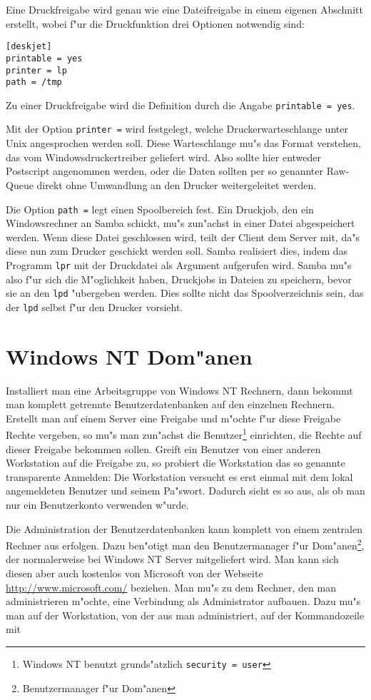 \documentclass{scrartcl}\usepackage{pslatex}\typearea{12}
\newcommand{\prog}{\texttt}
\newcommand{\param}{\texttt}
\begin{document}
Eine Druckfreigabe wird genau wie eine Dateifreigabe in einem eigenen
Abschnitt erstellt, wobei f"ur die Druckfunktion drei Optionen
notwendig sind:

\begin{verbatim}
[deskjet]
printable = yes
printer = lp
path = /tmp
\end{verbatim}

Zu einer Druckfreigabe wird die Definition durch die Angabe
\param{printable = yes}.

Mit der Option \param{printer =} wird festgelegt, welche
Druckerwarteschlange unter Unix angesprochen werden soll. Diese
Warteschlange mu"s das Format verstehen, das vom Windowsdruckertreiber
geliefert wird. Also sollte hier entweder Postscript angenommen
werden, oder die Daten sollten per so genannter Raw-Queue direkt ohne
Umwandlung an den Drucker weitergeleitet werden.

Die Option \param{path =} legt einen Spoolbereich fest. Ein Druckjob,
den ein Windowsrechner an Samba schickt, mu"s zun"achst in einer Datei
abgespeichert werden. Wenn diese Datei geschlossen wird, teilt der
Client dem Server mit, da"s diese nun zum Drucker geschickt werden
soll. Samba realisiert dies, indem das Programm \prog{lpr} mit der
Druckdatei als Argument aufgerufen wird. Samba mu"s also f"ur sich die
M"oglichkeit haben, Druckjobs in Dateien zu speichern, bevor sie an
den \prog{lpd} "ubergeben werden. Dies sollte nicht das
Spoolverzeichnis sein, das der \prog{lpd} selbst f"ur den Drucker
vorsieht.

\section{Windows NT Dom"anen}

Installiert man eine Arbeitsgruppe von Windows NT Rechnern, dann
bekommt man komplett getrennte Benutzerdatenbanken auf den einzelnen
Rechnern. Erstellt man auf einem Server eine Freigabe und m"ochte f"ur
diese Freigabe Rechte vergeben, so mu"s man zun"achst die
Benutzer\footnote{Windows NT benutzt grunds"atzlich \param{security =
    user}} einrichten, die Rechte auf dieser Freigabe bekommen sollen.
Greift ein Benutzer von einer anderen Workstation auf die Freigabe zu,
so probiert die Workstation das so genannte transparente Anmelden: Die
Workstation versucht es erst einmal mit dem lokal angemeldeten
Benutzer und seinem Pa"swort. Dadurch sieht es so aus, als ob man nur
ein Benutzerkonto verwenden w"urde.

Die Administration der Benutzerdatenbanken kann komplett von einem
zentralen Rechner aus erfolgen. Dazu ben"otigt man den Benutzermanager
f"ur Dom"anen\footnote{Benutzermanager f"ur Dom"anen}, der
normalerweise bei Windows NT Server mitgeliefert wird. Man kann sich
diesen aber auch kostenlos von Microsoft von der Webseite
\url{http://www.microsoft.com/} beziehen. Man mu"s zu dem Rechner, den
man administrieren m"ochte, eine Verbindung als Administrator
aufbauen. Dazu mu"s man auf der Workstation, von der aus man
administriert, auf der Kommandozeile mit 
\end{document}
